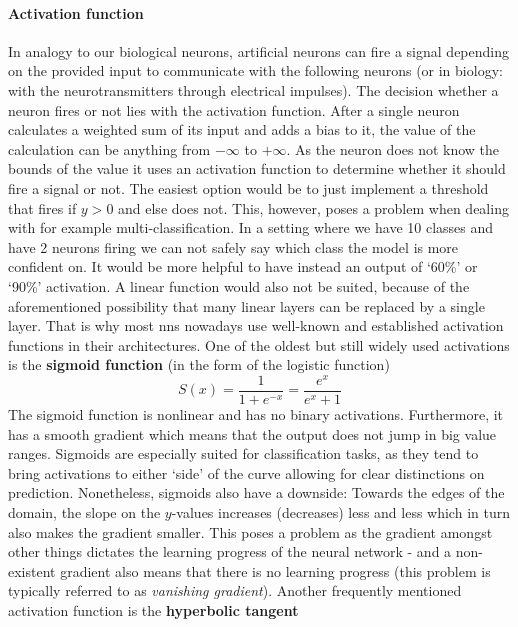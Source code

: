 \paragraph{Activation function}\label{par:activation_function}
In analogy to our biological neurons, artificial neurons can fire a signal depending on the provided input to communicate with the following neurons (or in biology: with the neurotransmitters through electrical impulses). The decision whether a neuron fires or not lies with the activation function. After a single neuron calculates a weighted sum of its input and adds a bias to it, the value of the calculation can be anything from $ -\infty $ to $ +\infty $. As the neuron does not know the bounds of the value it uses an activation function to determine whether it should fire a signal or not.
The easiest option would be to just implement a threshold that fires if $ y > 0 $ and else does not. This, however, poses a problem when dealing with for example multi-classification. In a setting where we have 10 classes and have 2 neurons firing we can not safely say which class the model is more confident on. It would be more helpful to have instead an output of `60\%' or `90\%' activation. A linear function would also not be suited, because of the aforementioned possibility that many linear layers can be replaced by a single layer. That is why most \gls{nn}s nowadays use well-known and established activation functions in their architectures. One of the oldest but still widely used activations is the \textbf{sigmoid function} (in the form of the logistic function)
\begin{equation}
	S(x) = \frac{1}{1+e^{-x}} = \frac {e^{x}}{e^{x}+1}
\end{equation}
The sigmoid function is nonlinear and has no binary activations. Furthermore, it has a smooth gradient which means that the output does not jump in big value ranges. Sigmoids are especially suited for classification tasks, as they tend to bring activations to either `side' of the curve allowing for clear distinctions on prediction. Nonetheless, sigmoids also have a downside: Towards the edges of the domain, the slope on the $ y $-values increases (decreases) less and less which in turn also makes the gradient smaller. This poses a problem as the gradient amongst other things dictates the learning progress of the neural network - and a non-existent gradient also means that there is no learning progress (this problem is typically referred to as \textit{vanishing gradient}). Another frequently mentioned activation function is the \textbf{hyperbolic tangent}

